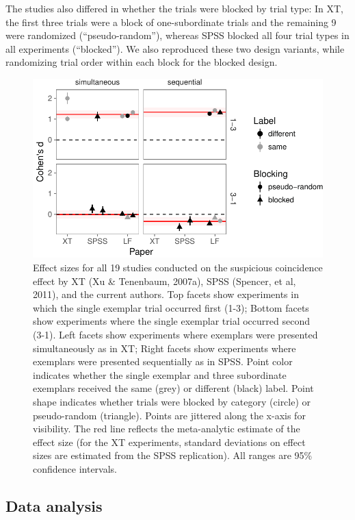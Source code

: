 \documentclass[english,floatsintext,man]{apa6}
\newcounter{author}
\theoremstyle{definition}
\theoremstyle{definition}
\theoremstyle{definition}
\theoremstyle{remark}
\begin{document}
The studies also differed in whether the trials were blocked by trial
type: In XT, the first three trials were a block of one-subordinate
trials and the remaining 9 were randomized (\enquote{pseudo-random}),
whereas SPSS blocked all four trial types in all experiments
(\enquote{blocked}). We also reproduced these two design variants, while
randomizing trial order within each block for the blocked design.

\begin{figure}
\centering
\includegraphics{xtmem_files/figure-latex/unnamed-chunk-4-1.pdf}
\caption{\label{fig:unnamed-chunk-4}Effect sizes for all 19 studies
conducted on the suspicious coincidence effect by XT (Xu \& Tenenbaum,
2007a), SPSS (Spencer, et al, 2011), and the current authors. Top facets
show experiments in which the single exemplar trial occurred first
(1-3); Bottom facets show experiments where the single exemplar trial
occurred second (3-1). Left facets show experiments where exemplars were
presented simultaneously as in XT; Right facets show experiments where
exemplars were presented sequentially as in SPSS. Point color indicates
whether the single exemplar and three subordinate exemplars received the
same (grey) or different (black) label. Point shape indicates whether
trials were blocked by category (circle) or pseudo-random (triangle).
Points are jittered along the x-axis for visibility. The red line
reflects the meta-analytic estimate of the effect size (for the XT
experiments, standard deviations on effect sizes are estimated from the
SPSS replication). All ranges are 95\% confidence intervals.}
\end{figure}

\subsection{Data analysis}\label{data-analysis}
\end{document}
